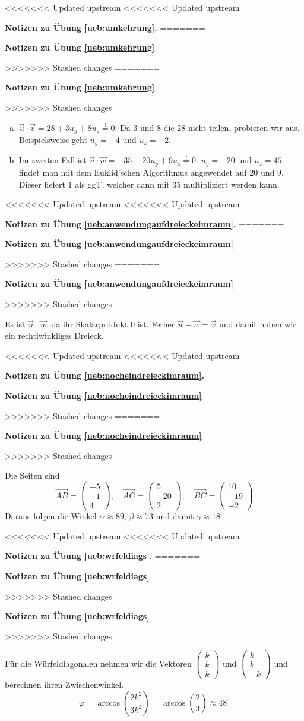 \documentclass[%
11pt,%
twoside,%
titlepage,%
<<<<<<< Updated upstream
<<<<<<< Updated upstream
german,%
=======
swissgerman,%
>>>>>>> Stashed changes
=======
swissgerman,%
>>>>>>> Stashed changes
headsepline%
]{scrartcl}
\newcommand{\faReturnGray}{\textcolor{gray}{\faMailReply}} %
\newcommand{\faReturnGray}{\textcolor{gray}{\faMailReply}} %
\theoremstyle{definition}
\theoremstyle{plain}
\newcommand{\concatueb}[1]{ueb:#1}%
\newcommand{\concatlsg}[1]{lsg:#1}%
\newenvironment{lsg}[1]{%
<<<<<<< Updated upstream
<<<<<<< Updated upstream
    \par\noindent\textbf{Notizen zu Übung \ref{\concatueb{#1}}.}%
    \label{\concatlsg{#1}}
=======
    \par\noindent\textbf{Notizen zu Übung \ref{\concatueb{#1}}}\label{\concatlsg{#1}}
    \hfill\hyperref[\concatueb{#1}]{\faReturnGray}\par %
>>>>>>> Stashed changes
=======
    \par\noindent\textbf{Notizen zu Übung \ref{\concatueb{#1}}}\label{\concatlsg{#1}}
    \hfill\hyperref[\concatueb{#1}]{\faReturnGray}\par %
>>>>>>> Stashed changes
}{%
    \par%
}
\begin{document}
\begin{lsg}{umkehrung}
\begin{enumerate}[a)]
    \item $\vec{u}\cdot\vec{v}=28+3u_y+8u_z\stackrel{!}{=}0$. Da $3$ und $8$ die $28$ nicht teilen, probieren wir aus. Beispielsweise geht $u_y=-4$ und $u_z=-2$.
    \item Im zweiten Fall ist $\vec{u}\cdot\vec{w}=-35+20u_y+9u_z\stackrel{!}{=}0$. $u_y=-20$ und $u_z=45$ findet man mit dem Euklid'schen Algorithmus angewendet auf $20$ und $9$. Dieser liefert $1$ als ggT, welcher dann mit 35 multipliziert werden kann.
\end{enumerate}
\end{lsg}
\begin{lsg}{anwendungaufdreieckeimraum}
Es ist $\vec{u}\bot\vec{w}$, da ihr Skalarprodukt $0$ ist. Ferner $\vec{u}-\vec{w}=\vec{v}$ und damit haben wir ein rechtiwinkliges Dreieck.
\end{lsg}
\begin{lsg}{nocheindreieckimraum}
Die Seiten sind
$$\vec{AB}=\begin{pmatrix}
    -5\\-1\\4
\end{pmatrix},\quad \vec{AC}=\begin{pmatrix}
    5\\-20\\2
\end{pmatrix},\quad \vec{BC}=\begin{pmatrix}
    10\\-19\\-2
\end{pmatrix}$$
Daraus folgen die Winkel $\alpha\approx89$, $\beta\approx73$ und damit $\gamma\approx18$
\end{lsg}
\begin{lsg}{wrfeldiags}
Für die Würfeldiagonalen nehmen wir die Vektoren $\begin{pmatrix}
    k\\k\\k
\end{pmatrix}$ und $\begin{pmatrix}
    k\\k\\-k
\end{pmatrix}$
und berechnen ihren Zwischenwinkel.
$$\varphi=\arccos\left(\frac{2k^2}{3k^2}\right)=\arccos\left(\frac{2}{3}\right)\approx48^\circ$$
\end{lsg}
\end{document}
